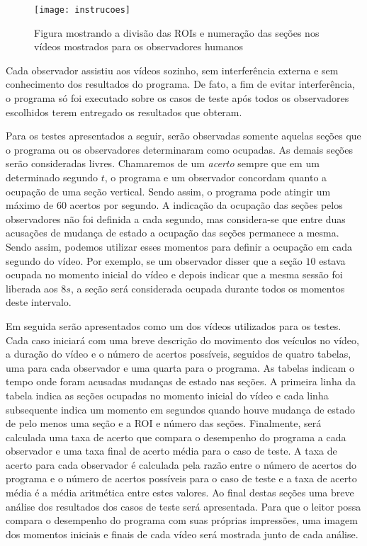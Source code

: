 \begin{figure}
\centering
\texttt{[image: instrucoes]}
\centering
\caption{Figura mostrando a divisão das ROIs e numeração das seções nos vídeos mostrados para os observadores humanos}
\label{fig:instrucao}
\end{figure}

Cada observador assistiu aos vídeos sozinho, sem interferência externa e sem conhecimento dos resultados do programa. De fato, a fim de evitar interferência, o programa só foi executado sobre os casos de teste após todos os observadores escolhidos terem entregado os resultados que obteram.

Para os testes apresentados a seguir, serão observadas somente aquelas seções que o programa ou os observadores determinaram como ocupadas. As demais seções serão consideradas livres. Chamaremos de um \textit{acerto} sempre que em um determinado segundo $t$, o programa e um observador concordam quanto a ocupação de uma seção vertical. Sendo assim, o programa pode atingir um máximo de $60$ acertos por segundo. A indicação da ocupação das seções pelos observadores não foi definida a cada segundo, mas considera-se que entre duas acusações de mudança de estado a ocupação das seções permanece a mesma. Sendo assim, podemos utilizar esses momentos para definir a ocupação em cada segundo do vídeo. Por exemplo, se um observador disser que a seção $10$ estava ocupada no momento inicial do vídeo e depois indicar que a mesma sessão foi liberada aos $8s$, a seção será considerada ocupada durante todos os momentos deste intervalo. 

Em seguida serão apresentados como um dos vídeos utilizados para os testes. Cada caso iniciará com uma breve descrição do movimento dos veículos no vídeo, a duração do vídeo e o número de acertos possíveis, seguidos de quatro tabelas, uma para cada observador e uma quarta para o programa. As tabelas indicam o tempo onde foram acusadas mudanças de estado nas seções. A primeira linha da tabela indica as seções ocupadas no momento inicial do vídeo e cada linha subsequente indica um momento em segundos quando houve mudança de estado de pelo menos uma seção e a ROI e número das seções. Finalmente, será calculada uma taxa de acerto que compara o desempenho do programa a cada observador e uma taxa final de acerto média para o caso de teste. A taxa de acerto para cada observador é calculada pela razão entre o número de acertos do programa e o número de acertos possíveis para o caso de teste e a taxa de acerto média é a média aritmética entre estes valores. Ao final destas seções uma breve análise dos resultados dos casos de teste será apresentada. Para que o leitor possa compara o desempenho do programa com suas próprias impressões, uma imagem dos momentos iniciais e finais de cada vídeo será mostrada junto de cada análise.



